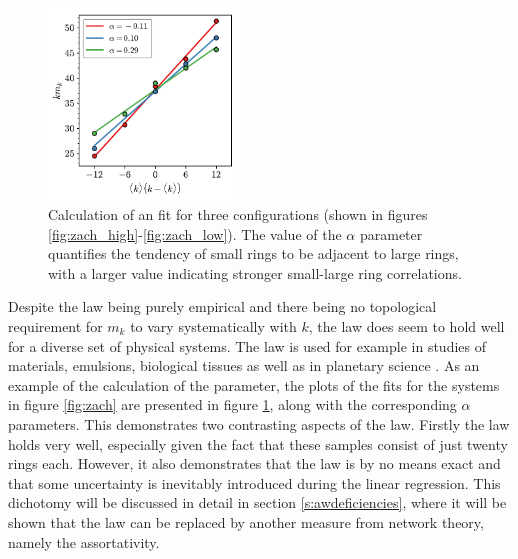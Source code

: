 \begin{figure}[tb]
     \centering
      \includegraphics[width=0.45\textwidth]{./figures/methods/aw_demo.pdf}
     \caption{Calculation of an \aw{} fit for three configurations (shown in figures \ref{fig:zach_high}\--\ref{fig:zach_low}). The value of the $\alpha$ parameter quantifies the tendency of small rings to be adjacent to large rings, with a larger value indicating stronger small\--large ring correlations.}
     \label{fig:awdemo}
\end{figure}

Despite the \aw{} law being purely empirical and there being no topological requirement for $m_k$ to vary systematically with $k$, the law does seem to hold well for a diverse set of physical systems.
The law is used for example in studies of materials, emulsions, biological tissues as well as in planetary science \cite{LeRoux2013,Roy2018,Noever1992,Mombach1993,Pedro2008}.
As an example of the calculation of the \aw{} parameter, the plots of the fits for the systems in figure \ref{fig:zach} are presented in figure \ref{fig:awdemo}, along with the corresponding $\alpha$ parameters.
This demonstrates two contrasting aspects of the \aw{} law. 
Firstly the law holds very well, especially given the fact that these samples consist of just twenty rings each.
However, it also demonstrates that the law is by no means exact and that some uncertainty is inevitably introduced during the linear regression.
This dichotomy will be discussed in detail in section \ref{s:awdeficiencies}, where it will be shown that the \aw{} law can be replaced by another measure from network theory, namely the assortativity.
